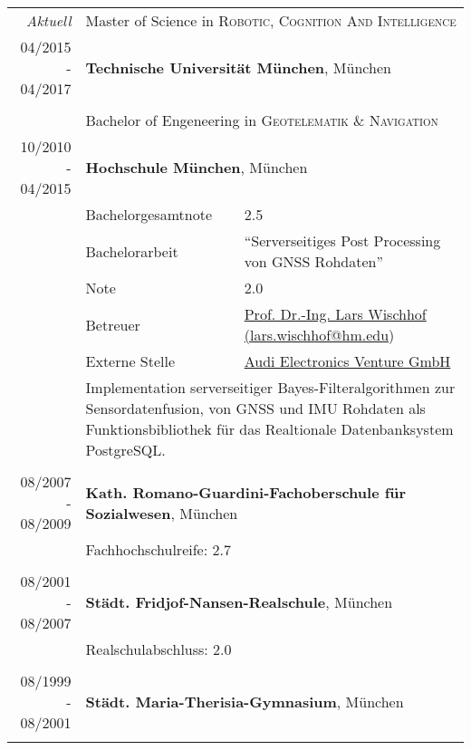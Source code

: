 \documentclass[a4paper,10pt]{article} %
\begin{document}
\begin{tabular}{r|l@{: }p{11cm}}
\emph{Aktuell} & \multicolumn{2}{p{11cm}}{Master of Science in \textsc{Robotic, Cognition And Intelligence}}\\
\textsc{04/2015 - 04/2017} & \multicolumn{2}{p{11cm}}{\textbf{Technische Universit\"at M\"unchen}, M\"unchen} \\
\multicolumn{3}{c}{}\\
 & \multicolumn{2}{p{11cm}}{Bachelor of Engeneering in \textsc{Geotelematik \& Navigation}}\\
\textsc{10/2010 - 04/2015} & \multicolumn{2}{p{11cm}}{\textbf{Hochschule München}, München} \\
                           & \small Bachelorgesamtnote & \small  2.5\\
                           & \small Bachelorarbeit & \small ``Serverseitiges Post Processing von GNSS Rohdaten'' \\
                           & \small Note           & \small 2.0\\
			                     & \small Betreuer       & \small \href{mailto:lars.wischhof@hm.edu}{Prof. Dr.-Ing. Lars Wischhof (lars.wischhof@hm.edu}) \\
                           & \small Externe Stelle & \small \href{http://www.audi-electronics-venture.de}{Audi Electronics Venture GmbH} \\
                           & \multicolumn{2}{p{11cm}}{\small Implementation serverseitiger Bayes-Filteralgorithmen zur Sensordatenfusion, von GNSS und IMU Rohdaten als Funktionsbibliothek für das Realtionale Datenbanksystem PostgreSQL.}\\
\multicolumn{3}{c}{}\\
 
 
\textsc{08/2007 - 08/2009} & \multicolumn{2}{p{11cm}}{\textbf{Kath. Romano-Guardini-Fachoberschule für Sozialwesen}, München} \\
                           & \multicolumn{2}{p{11cm}}{\small Fachhochschulreife: 2.7}                                         \\
\multicolumn{3}{c}{}                                                                                \\
 
 
\textsc{08/2001 - 08/2007} & \multicolumn{2}{p{11cm}}{\textbf{Städt. Fridjof-Nansen-Realschule}, München} \\
                           & \multicolumn{2}{p{11cm}}{\small Realschulabschluss: 2.0} \\
\multicolumn{3}{c}{}\\
 
 
\textsc{08/1999 - 08/2001} & \multicolumn{2}{p{11cm}}{\textbf{Städt. Maria-Therisia-Gymnasium}, München} \\
\multicolumn{3}{c}{}\\
\end{tabular}
 
\end{document}
